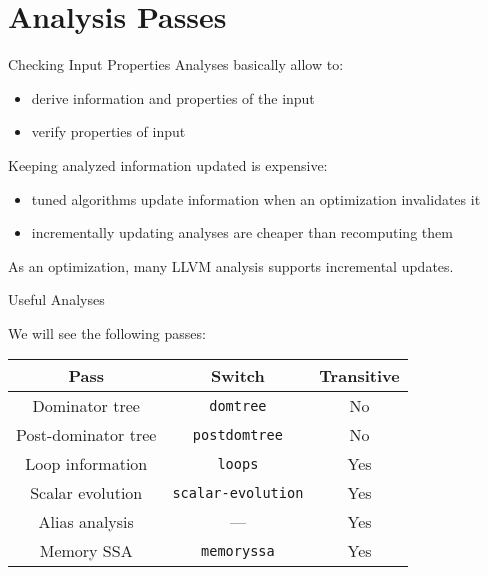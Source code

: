 
\section{Analysis Passes}


\begin{frame}{Checking Input Properties}
Analyses basically allow to:
\begin{itemize}
\item \alert{derive} information and properties of the input
\item \alert{verify} properties of input
\end{itemize}

\vfill
Keeping analyzed information updated is expensive:
\begin{itemize}
\item tuned algorithms update information when an optimization
      invalidates it
\item incrementally updating analyses are cheaper than recomputing them
\end{itemize}

\vfill
As an \alert{optimization}, many LLVM analysis supports incremental updates.
\end{frame}


\begin{frame}{Useful Analyses}
\begin{center}
We will see the following passes:\\
\bigskip
\begin{tabular}{ccc}
\toprule

\multicolumn{1}{c}{\textbf{Pass}}        &
\multicolumn{1}{c}{\textbf{Switch}}      &
\multicolumn{1}{c}{\textbf{Transitive}} \\

\midrule

Dominator tree    &
\texttt{domtree}  &
No               \\

Post-dominator tree   &
\texttt{postdomtree}  &
No                   \\

Loop information  &
\texttt{loops}    &
Yes              \\

Scalar evolution           &
\texttt{scalar-evolution}  &
Yes                       \\

Alias analysis    &
---  &
Yes              \\

Memory SSA  &
\texttt{memoryssa}    &
Yes               \\

\bottomrule
\end{tabular}
\end{center}
\end{frame}


